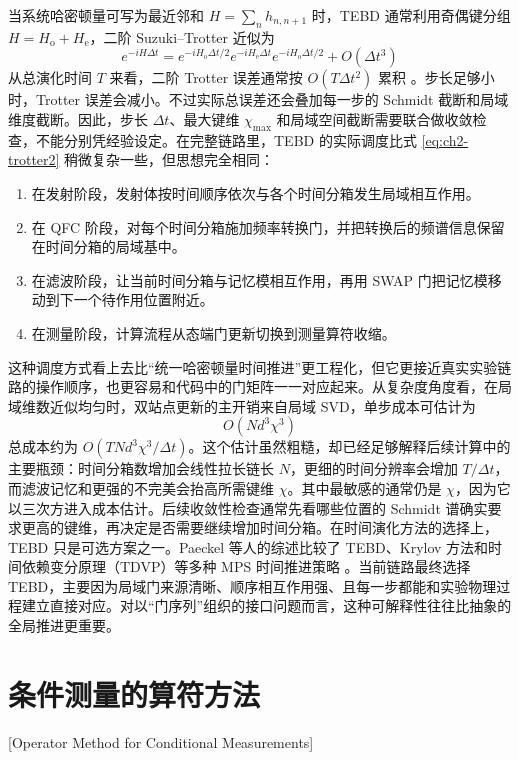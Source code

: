 当系统哈密顿量可写为最近邻和 $H=\sum_n h_{n,n+1}$ 时，TEBD 通常利用奇偶键分组 $H=H_{\mathrm{o}}+H_{\mathrm{e}}$，二阶 Suzuki--Trotter 近似为
\begin{equation}
e^{-iH\Delta t}
=
e^{-iH_{\mathrm{o}}\Delta t/2}
e^{-iH_{\mathrm{e}}\Delta t}
e^{-iH_{\mathrm{o}}\Delta t/2}
+O(\Delta t^3)
\label{eq:ch2-trotter2}
\end{equation}
从总演化时间 $T$ 来看，二阶 Trotter 误差通常按 $O(T\Delta t^2)$ 累积 \cite{Vidal2004TEBD,Paeckel2019TimeEvolutionMPS}。步长足够小时，Trotter 误差会减小。不过实际总误差还会叠加每一步的 Schmidt 截断和局域维度截断。因此，步长 $\Delta t$、最大键维 $\chi_{\max}$ 和局域空间截断需要联合做收敛检查，不能分别凭经验设定。在完整链路里，TEBD 的实际调度比式 \eqref{eq:ch2-trotter2} 稍微复杂一些，但思想完全相同：
\begin{enumerate}
  \item 在发射阶段，发射体按时间顺序依次与各个时间分箱发生局域相互作用。\item 在 QFC 阶段，对每个时间分箱施加频率转换门，并把转换后的频谱信息保留在时间分箱的局域基中。\item 在滤波阶段，让当前时间分箱与记忆模相互作用，再用 SWAP 门把记忆模移动到下一个待作用位置附近。\item 在测量阶段，计算流程从态端门更新切换到测量算符收缩。
\end{enumerate}
这种调度方式看上去比“统一哈密顿量时间推进”更工程化，但它更接近真实实验链路的操作顺序，也更容易和代码中的门矩阵一一对应起来。从复杂度角度看，在局域维数近似均匀时，双站点更新的主开销来自局域 SVD，单步成本可估计为
\begin{equation}
O(Nd^3\chi^3)
\label{eq:ch2-single-step-cost}
\end{equation}
总成本约为 $O(TNd^3\chi^3/\Delta t)$。这个估计虽然粗糙，却已经足够解释后续计算中的主要瓶颈：时间分箱数增加会线性拉长链长 $N$，更细的时间分辨率会增加 $T/\Delta t$，而滤波记忆和更强的不完美会抬高所需键维 $\chi$。其中最敏感的通常仍是 $\chi$，因为它以三次方进入成本估计。后续收敛性检查通常先看哪些位置的 Schmidt 谱确实要求更高的键维，再决定是否需要继续增加时间分箱。在时间演化方法的选择上，TEBD 只是可选方案之一。Paeckel 等人的综述比较了 TEBD、Krylov 方法和时间依赖变分原理（TDVP）等多种 MPS 时间推进策略 \cite{Paeckel2019TimeEvolutionMPS}。当前链路最终选择 TEBD，主要因为局域门来源清晰、顺序相互作用强、且每一步都能和实验物理过程建立直接对应。对以“门序列”组织的接口问题而言，这种可解释性往往比抽象的全局推进更重要。

\section{条件测量的算符方法}[Operator Method for Conditional Measurements]

